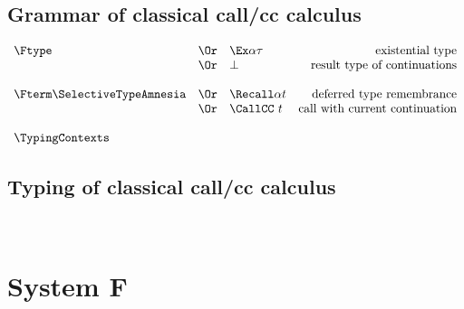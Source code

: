 \documentclass{amsart}
\begin{document}
\subsection{Grammar of classical call/cc calculus}

\nc{}

\[
\begin{array}{lclr}
\Ftype
&\Or& \Ex\alpha\tau & \mbox{existential type} \\
&\Or& \bot & \mbox{result type of continuations} \\
\\
\Fterm
\SelectiveTypeAmnesia
&\Or& \Recall\alpha t & \mbox{deferred type remembrance} \\
&\Or& \CallCC~t & \mbox{call with current continuation} \\
\\
\TypingContexts
\end{array}
\]

\subsection{Typing of classical call/cc calculus}
~

\nc{}

\nc{}

\nc{}

\FRules

\ExistentialIntroduction

\ExistentialElimination

\DoubleNegationElimination

\section{System F}
\end{document}
